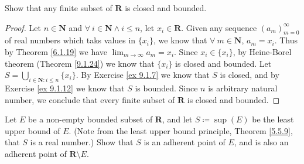 \begin{exercise}\label{ex 9.1.14}
    Show that any finite subset of \(\mathbf{R}\) is closed and bounded.
\end{exercise}

\begin{proof}
    Let \(n \in \mathbf{N}\) and \(\forall\ i \in \mathbf{N} \land i \leq n\), let \(x_i \in \mathbf{R}\).
    Given any sequence \((a_m)_{m = 0}^\infty\) of real numbers which taks values in \(\{x_i\}\), we know that \(\forall\ m \in \mathbf{N}\), \(a_m = x_i\).
    Thus by Theorem \ref{6.1.19} we have \(\lim_{m \to \infty} a_m = x_i\).
    Since \(x_i \in \{x_i\}\), by Heine-Borel theorem (Theorem \ref{9.1.24}) we know that \(\{x_i\}\) is closed and bounded.
    Let \(S = \bigcup_{i \in \mathbf{N} : i \leq n} \{x_i\}\).
    By Exercise \ref{ex 9.1.7} we know that \(S\) is closed, and by Exercise \ref{ex 9.1.12} we know that \(S\) is bounded.
    Since \(n\) is arbitrary natural number, we conclude that every finite subset of \(\mathbf{R}\) is closed and bounded.
\end{proof}

\begin{exercise}\label{ex 9.1.15}
    Let \(E\) be a non-empty bounded subset of \(\mathbf{R}\), and let \(S \coloneqq \sup(E)\) be the least upper bound of \(E\).
    (Note from the least upper bound principle, Theorem \ref{5.5.9}, that \(S\) is a real number.)
    Show that \(S\) is an adherent point of \(E\), and is also an adherent point of \(\mathbf{R} \setminus E\).
\end{exercise}

